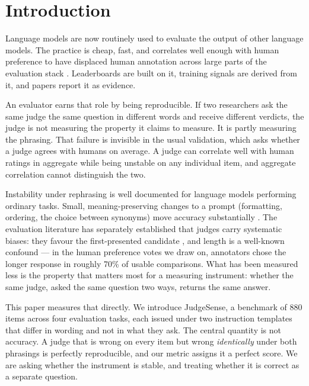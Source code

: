 \section{Introduction}
\label{sec:intro}

Language models are now routinely used to evaluate the output of other language
models. The practice is cheap, fast, and correlates well enough with human
preference to have displaced human annotation across large parts of the
evaluation stack \citep{zheng2023judging}. Leaderboards are built on it, training
signals are derived from it, and papers report it as evidence.

An evaluator earns that role by being reproducible. If two researchers ask the
same judge the same question in different words and receive different verdicts,
the judge is not measuring the property it claims to measure. It is partly
measuring the phrasing. That failure is invisible in the usual validation, which
asks whether a judge agrees with humans on average. A judge can correlate well
with human ratings in aggregate while being unstable on any individual item, and
aggregate correlation cannot distinguish the two.

Instability under rephrasing is well documented for language models performing
ordinary tasks. Small, meaning-preserving changes to a prompt (formatting, ordering, the choice
between synonyms) move accuracy substantially
\citep{sclar2024quantifying, mizrahi2024state, elazar2021measuring}. The
evaluation literature has separately established that judges carry systematic
biases: they favour the first-presented candidate
\citep{wang2023fair, shi2024judging}, and length is a well-known confound --- in
the human preference votes we draw on, annotators chose the longer response in
roughly 70\% of usable comparisons. What has been measured less is the
property that matters most for a measuring instrument: whether the same judge,
asked the same question two ways, returns the same answer.

This paper measures that directly. We introduce JudgeSense, a benchmark of 880
items across four evaluation tasks, each issued under two instruction templates
that differ in wording and not in what they ask. The central quantity is not
accuracy. A judge that is wrong on every item but wrong \emph{identically} under
both phrasings is perfectly reproducible, and our metric assigns it a perfect
score. We are asking whether the instrument is stable, and treating whether it is
correct as a separate question.

